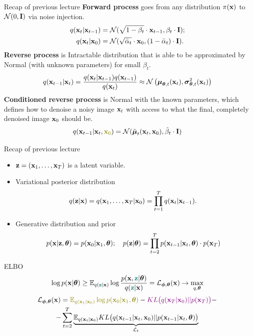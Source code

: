 \begin{frame}{Recap of previous lecture}
	\textbf{Forward process} goes from any distribution $\pi(\mathbf{x})$ to $\mathcal{N}(0, \mathbf{I})$ via noise injection.
	\begin{align*}
		q(\mathbf{x}_t | \mathbf{x}_{t-1}) &= \mathcal{N}(\sqrt{1 - \beta_t} \cdot \mathbf{x}_{t-1}, \beta_t \cdot \mathbf{I}); \\
		q(\mathbf{x}_t | \mathbf{x}_0) &= \mathcal{N}(\sqrt{\bar{\alpha}_t} \cdot \mathbf{x}_0, (1 - \bar{\alpha}_t) \cdot \mathbf{I}).
	\end{align*}
	\textbf{Reverse process} is Intractable distribution that is able to be approximated by Normal (with unknown parameters) for small $\beta_t$.
	\[
		q(\mathbf{x}_{t-1}|\mathbf{x}_{t}) = \frac{q(\mathbf{x}_{t}|\mathbf{x}_{t-1}) q(\mathbf{x}_{t-1})}{q(\mathbf{x}_{t})} \approx \mathcal{N} \left(\boldsymbol{\mu}_{\boldsymbol{\theta}, t}(\mathbf{x}_t), \boldsymbol{\sigma}_{\boldsymbol{\theta}, t}^2(\mathbf{x}_t)\right)
	\]
	\textbf{Conditioned reverse process} is Normal with the known parameters, which defines how to denoise a noisy image $\mathbf{x}_t$ with access to what the final, completely denoised image $\mathbf{x}_0$ should be.
	\[
		q(\bx_{t-1}|\bx_{t}, {\color{olive}\bx_0}) = \cN(\tilde{\bmu}_t(\bx_t, \bx_0), \tilde{\beta}_t \cdot \bI)
	\]
\end{frame}
\begin{frame}{Recap of previous lecture}
	\begin{itemize}
		\item $\mathbf{z} = (\mathbf{x}_1, \dots, \mathbf{x}_T)$ is a latent variable.
		\item Variational posterior distribution
		\vspace{-0.2cm}
		\[
			q(\mathbf{z} | \mathbf{x}) = q(\mathbf{x}_1, \dots, \mathbf{x}_T | \mathbf{x}_0) = \prod_{t = 1}^T q(\mathbf{x}_t | \mathbf{x}_{t - 1}).
		\]
		\vspace{-0.3cm}
		\item Generative distribution and prior
		\vspace{-0.2cm}
		\[
			p(\mathbf{x} | \mathbf{z}, \boldsymbol{\theta}) = p(\mathbf{x}_0 | \mathbf{x}_1, \boldsymbol{\theta}); \quad 
			p(\mathbf{z} | \boldsymbol{\theta}) = \prod_{t=2}^T p(\mathbf{x}_{t - 1} | \mathbf{x}_t, \boldsymbol{\theta}) \cdot p(\mathbf{x}_T)
		\]
	\end{itemize}
	\vspace{-0.2cm}
	\begin{block}{ELBO}
		\vspace{-0.2cm}
		\[
			\log p(\mathbf{x} | \boldsymbol{\theta}) \geq \mathbb{E}_{q({\color{teal}\mathbf{z}} | \mathbf{x})} \log \frac{p(\mathbf{x}, {\color{teal}\mathbf{z}} | \boldsymbol{\theta})}{q({\color{teal}\mathbf{z}} | \mathbf{x})} = \mathcal{L}_{\boldsymbol{\phi}, \boldsymbol{\theta}}(\mathbf{x}) \rightarrow \max_{q, \boldsymbol{\theta}}
		\]
		\vspace{-0.5cm}
		\begin{multline*}
			\cL_{\bphi, \btheta}(\bx) =  {\color{olive}\bbE_{q(\bx_1 | \bx_0)} \log p(\bx_0 | \bx_1, \btheta)} - {\color{violet}KL\bigl(q(\bx_T | \bx_0) || p(\bx_T)\bigr)} - \\
			- \sum_{t=2}^T  \underbrace{ \bbE_{q(\bx_t | \bx_0)}KL \bigl(q(\bx_{t-1} | \bx_t, \bx_0) || p(\bx_{t - 1} | \bx_t, \btheta )\bigr)}_{\cL_t}
		\end{multline*}
	\end{block}
\end{frame}
